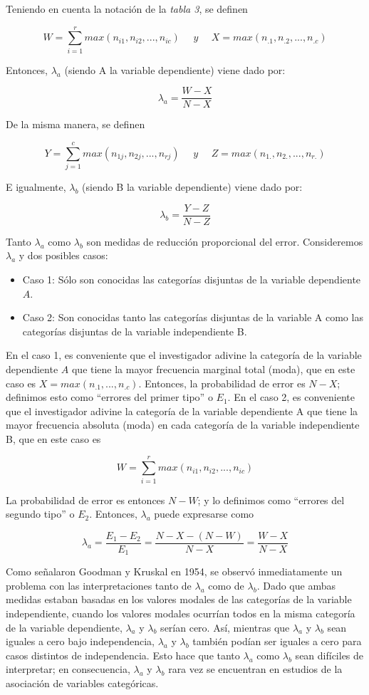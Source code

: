 \documentclass[12pt,a4paper,]{book}
\numberwithin{dummy}{section}
\theoremstyle{ocrenumbox}
\theoremstyle{blacknumex}
\theoremstyle{blacknumbox}
\theoremstyle{ocrenum}
\theoremstyle{ocrenum}
\begin{document}
Teniendo en cuenta la notación de la \emph{tabla 3}, se definen

\[
W=\sum_{i=1}^rmax(n_{i1},n_{i2},...,n_{ic})  ~~~~~~y~~~~~~ X=max(n_{.1},n_{.2},...,n_{.c})
\]

Entonces, \(\lambda_a\) (siendo A la variable dependiente) viene dado
por:

\[
\lambda_a=\frac{W-X}{N-X}
\]

De la misma manera, se definen

\[
Y=\sum_{j=1}^cmax(n_{1j},n_{2j},...,n_{rj})  ~~~~~~y ~~~~~~ Z=max(n_{1.},n_{2.},...,n_{r.})
\]

E igualmente, \(\lambda_b\) (siendo B la variable dependiente) viene
dado por:

\[
\lambda_b=\frac{Y-Z}{N-Z}
\]

Tanto \(\lambda_a\) como \(\lambda_b\) son medidas de reducción
proporcional del error. Consideremos \(\lambda_a\) y dos posibles casos:

\begin{itemize}
\item
  Caso 1: Sólo son conocidas las categorías disjuntas de la variable
  dependiente \(A\).
\item
  Caso 2: Son conocidas tanto las categorías disjuntas de la variable A
  como las categorías disjuntas de la variable independiente B.
\end{itemize}

En el caso 1, es conveniente que el investigador adivine la categoría de
la variable dependiente \(A\) que tiene la mayor frecuencia marginal
total (moda), que en este caso es \(X = max(n_{.1}, . . . , n_{.c})\).
Entonces, la probabilidad de error es \(N-X\); definimos esto como
``errores del primer tipo'' o \(E_1\). En el caso 2, es conveniente que
el investigador adivine la categoría de la variable dependiente A que
tiene la mayor frecuencia absoluta (moda) en cada categoría de la
variable independiente B, que en este caso es

\[
W=\sum_{i=1}^rmax(n_{i1},n_{i2},...,n_{ic})
\]

La probabilidad de error es entonces \(N - W\); y lo definimos como
``errores del segundo tipo'' o \(E_2\). Entonces, \(\lambda_a\) puede
expresarse como

\[
\lambda_a=\frac{E_1-E_2}{E_1}=\frac{N-X-(N-W)}{N-X}=\frac{W-X}{N-X}
\]

Como señalaron Goodman y Kruskal en 1954, se observó inmediatamente un
problema con las interpretaciones tanto de \(\lambda_a\) como de
\(\lambda_b\). Dado que ambas medidas estaban basadas en los valores
modales de las categorías de la variable independiente, cuando los
valores modales ocurrían todos en la misma categoría de la variable
dependiente, \(\lambda_a\) y \(\lambda_b\) serían cero. Así, mientras
que \(\lambda_a\) y \(\lambda_b\) sean iguales a cero bajo
independencia, \(\lambda_a\) y \(\lambda_b\) también podían ser iguales
a cero para casos distintos de independencia. Esto hace que tanto
\(\lambda_a\) como \(\lambda_b\) sean difíciles de interpretar; en
consecuencia, \(\lambda_a\) y \(\lambda_b\) rara vez se encuentran en
estudios de la asociación de variables categóricas.
\end{document}

